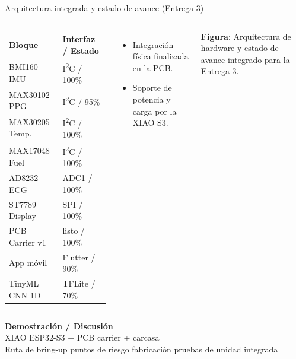 \documentclass[aspectratio=169, 10pt]{beamer}
\begin{document}
\begin{frame}{Arquitectura integrada y estado de avance (Entrega 3)}
    \begin{columns}[T]
        \scriptsize
        \begin{tabular}{l l}
            \toprule
            \textbf{Bloque} & \textbf{Interfaz / Estado} \\
            \midrule
            BMI160 IMU & I\textsuperscript{2}C / 100\% \\
            MAX30102 PPG & I\textsuperscript{2}C / 95\% \\
            MAX30205 Temp. & I\textsuperscript{2}C / 100\% \\
            MAX17048 Fuel & I\textsuperscript{2}C / 100\% \\
            AD8232 ECG & ADC1 / 100\% \\
            ST7789 Display & SPI / 100\% \\
            PCB Carrier v1 & listo / 100\% \\
            App m\'ovil & Flutter / 90\% \\
            TinyML CNN 1D & TFLite / 70\% \\
            \bottomrule
        \end{tabular}
        \vspace{0.15cm}
        \begin{itemize}\itemsep0.04cm
            \item Integraci\'on f\'isica finalizada en la PCB.
            \item Soporte de potencia y carga por la XIAO S3.
        \end{itemize}
        \vspace{-0.25cm}
        \begin{flushright}
            \resizebox{1.02\linewidth}{!}{}
            \vspace{0.05cm}\newline
            \scriptsize\textbf{Figura}: Arquitectura de hardware y estado de avance integrado para la Entrega 3.
        \end{flushright}
    \end{columns}
\end{frame}

\begin{frame}[plain]
    \centering
    \vspace{1.25cm}
    {\Huge \color{main} \textbf{Demostraci\'on / Discusi\'on}}\\[0.6cm]
    {\Large XIAO ESP32-S3 + PCB carrier + carcasa}\\[0.4cm]
    \footnotesize
    Ruta de bring-up \textbar{} puntos de riesgo \textbar{} fabricaci\'on \textbar{} pruebas de unidad integrada
\end{frame}
\end{document}
